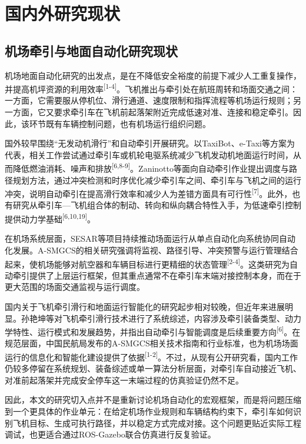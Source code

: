 \section{国内外研究现状}

\subsection{机场牵引与地面自动化研究现状}

机场地面自动化研究的出发点，是在不降低安全裕度的前提下减少人工重复操作，并提高机坪资源的利用效率\textsuperscript{[1-4]}。飞机推出与牵引处在航班周转和场面交通之间：一方面，它需要服从停机位、滑行通道、速度限制和指挥流程等机场运行规则；另一方面，它又要求牵引车在飞机前起落架附近完成低速对准、连接和稳定牵引。因此，该环节既有车辆控制问题，也有机场运行组织问题。

国外较早围绕“无发动机滑行”和自动牵引开展研究。以TaxiBot、e-Taxi等方案为代表，相关工作尝试通过牵引车或机轮电驱系统减少飞机发动机地面运行时间，从而降低燃油消耗、噪声和排放\textsuperscript{[6,8-9]}。Zaninotto等面向自动牵引作业提出调度与路径规划方法，通过冲突检测和时序优化减少牵引车之间、牵引车与飞机之间的运行冲突，说明自动牵引在提高滑行效率和减少人为差错方面具有可行性\textsuperscript{[7]}。此外，也有研究从牵引车---飞机组合体的制动、转向和纵向耦合特性入手，为低速牵引控制提供动力学基础\textsuperscript{[6,10,19]}。

在机场系统层面，SESAR等项目持续推动场面运行从单点自动化向系统协同自动化发展。A-SMGCS的相关研究强调将监视、路径引导、冲突预警与运行管理结合起来，使机场能够对航空器和车辆目标进行更精细的状态管理\textsuperscript{[2-4]}。这类研究为自动牵引提供了上层运行框架，但其重点通常不在牵引车末端对接控制本身，而在于更大范围的场面交通监视与运行调度。

国内关于飞机牵引滑行和地面运行智能化的研究起步相对较晚，但近年来进展明显。孙艳坤等对飞机牵引滑行技术进行了系统综述，内容涉及牵引装备类型、动力学特性、运行模式和发展趋势，并指出自动牵引与智能调度是后续重要方向\textsuperscript{[6]}。在规范层面，中国民航局发布的A-SMGCS相关技术指南和行业标准，也为机场场面运行的信息化和智能化建设提供了依据\textsuperscript{[1-2]}。不过，从现有公开研究看，国内工作仍较多停留在系统规划、装备综述或单一算法分析层面，对牵引车自动接近飞机、对准前起落架并完成安全停车这一末端过程的仿真验证仍然不足。

因此，本文的研究切入点并不是重新讨论机场自动化的宏观框架，而是将问题压缩到一个更具体的作业单元：在给定机场作业规则和车辆结构约束下，牵引车如何识别飞机目标、生成可执行路径，并以稳定方式完成对接。这个问题更贴近实际工程调试，也更适合通过ROS-Gazebo联合仿真进行反复验证。

